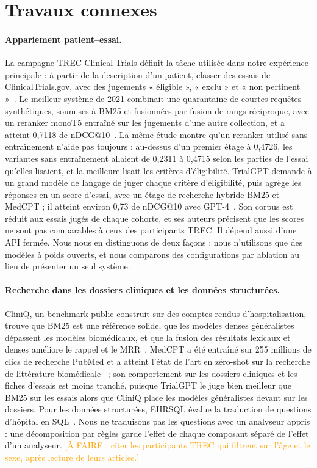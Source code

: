 \documentclass{article}
\newcommand{\todo}[1]{\textcolor{orange}{[À FAIRE : #1]}}
\begin{document}
\section{Travaux connexes}
\label{sec:related}

\paragraph{Appariement patient--essai.} La campagne TREC Clinical Trials définit la tâche utilisée dans notre expérience principale : à partir de la description d'un patient, classer des essais de ClinicalTrials.gov, avec des jugements « éligible », « exclu » et « non pertinent »~\citep{roberts2022trecct}. Le meilleur système de 2021 combinait une quarantaine de courtes requêtes synthétiques, soumises à BM25 et fusionnées par fusion de rangs réciproque, avec un reranker monoT5 entraîné sur les jugements d'une autre collection, et a atteint 0,7118 de nDCG@10~\citep{pradeep2022nqs}. La même étude montre qu'un reranker utilisé sans entraînement n'aide pas toujours : au-dessus d'un premier étage à 0,4726, les variantes sans entraînement allaient de 0,2311 à 0,4715 selon les parties de l'essai qu'elles lisaient, et la meilleure lisait les critères d'éligibilité. TrialGPT demande à un grand modèle de langage de juger chaque critère d'éligibilité, puis agrège les réponses en un score d'essai, avec un étage de recherche hybride BM25 et MedCPT ; il atteint environ 0,73 de nDCG@10 avec GPT-4~\citep{jin2024trialgpt}. Son corpus est réduit aux essais jugés de chaque cohorte, et ses auteurs précisent que les scores ne sont pas comparables à ceux des participants TREC. Il dépend aussi d'une API fermée. Nous nous en distinguons de deux façons : nous n'utilisons que des modèles à poids ouverts, et nous comparons des configurations par ablation au lieu de présenter un seul système.

\paragraph{Recherche dans les dossiers cliniques et les données structurées.} CliniQ, un benchmark public construit sur des comptes rendus d'hospitalisation, trouve que BM25 est une référence solide, que les modèles denses généralistes dépassent les modèles biomédicaux, et que la fusion des résultats lexicaux et denses améliore le rappel et le MRR~\citep{zhao2025cliniq}. MedCPT a été entraîné sur 255 millions de clics de recherche PubMed et a atteint l'état de l'art en zéro-shot sur la recherche de littérature biomédicale~\citep{jin2023medcpt} ; son comportement sur les dossiers cliniques et les fiches d'essais est moins tranché, puisque TrialGPT le juge bien meilleur que BM25 sur les essais alors que CliniQ place les modèles généralistes devant sur les dossiers. Pour les données structurées, EHRSQL évalue la traduction de questions d'hôpital en SQL~\citep{lee2022ehrsql}. Nous ne traduisons pas les questions avec un analyseur appris : une décomposition par règles garde l'effet de chaque composant séparé de l'effet d'un analyseur. \todo{citer les participants TREC qui filtrent sur l'âge et le sexe, après lecture de leurs articles.}
\end{document}
